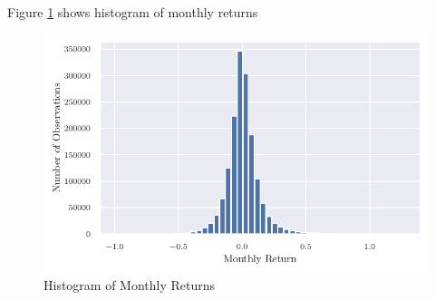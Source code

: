 Figure \ref{fig:hist_returns} shows histogram of monthly returns 


\begin{center}
	\begin{figure}
		\includegraphics{Figures/hist_returns.pdf}
		\caption{Histogram of Monthly Returns}
		\label{fig:hist_returns}
	\end{figure}
\end{center}



